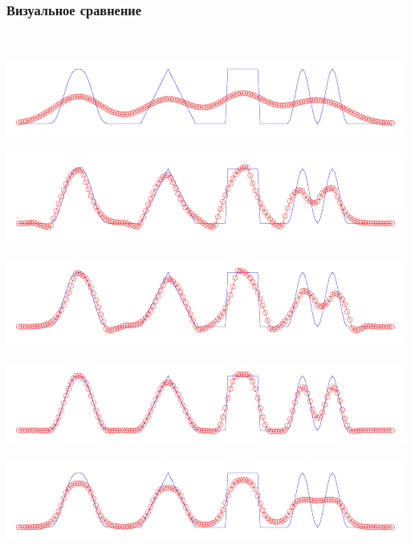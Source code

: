 \documentclass[ucs]{beamer}
\begin{document}
\begin{frame}
	\frametitle{Визуальное сравнение}
	\begin{columns}
		\\
		\includegraphics[width=\textwidth]{conver/first}\\
		\pause[2]
		\\
		\includegraphics[width=\textwidth]{conver/lw}\\
		\\
		\includegraphics[width=\textwidth]{conver/bw}\\
		\\
		\includegraphics[width=\textwidth]{conver/fromm}\\
		\pause[3]
		\\
		\includegraphics[width=\textwidth]{conver/minmod}\\
		\pause[4]
		\\

\end{columns}
\end{frame}
\end{document}
